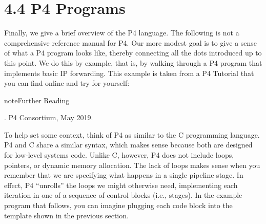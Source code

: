 \documentclass[letterpaper,11pt,english]{sphinxmanual}
\begin{document}
\section{4.4 P4 Programs}
\label{\detokenize{switch:p4-programs}}
Finally, we give a brief overview of the P4 language. The following is
not a comprehensive reference manual for P4. Our more modest goal is
to give a sense of what a P4 program looks like, thereby connecting
all the dots introduced up to this point. We do this by example, that
is, by walking through a P4 program that implements basic IP
forwarding. This example is taken from a P4 Tutorial that you can find
online and try for yourself:

\label{\detokenize{switch:reading-p4}}
\begin{sphinxadmonition}{note}{Further Reading}

. P4 Consortium, May 2019.
\end{sphinxadmonition}

To help set some context, think of P4 as similar to the C programming
language. P4 and C share a similar syntax, which makes sense because
both are designed for low-level systems code. Unlike C, however, P4
does not include loops, pointers, or dynamic memory allocation. The
lack of loops makes sense when you remember that we are specifying
what happens in a single pipeline stage. In effect, P4 “unrolls” the
loops we might otherwise need, implementing each iteration in one of a
sequence of control blocks (i.e., stages). In the example program that
follows, you can imagine plugging each code block into the template
shown in the previous section.
\end{document}
